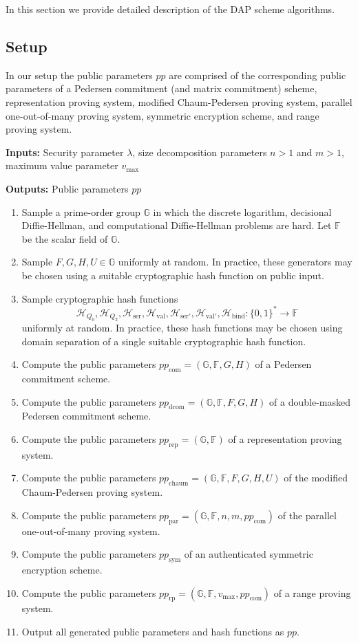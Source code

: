 \documentclass{llncs}
\newcommand{\G}{\mathbb{G}}
\newcommand{\F}{\mathbb{F}}
\newcommand{\hash}{\mathcal{H}}
\begin{document}
In this section we provide detailed description of the DAP scheme algorithms.


\subsection{Setup}

In our setup the public parameters $pp$ are comprised of the corresponding public parameters of a Pedersen commitment (and matrix commitment) scheme, representation proving system, modified Chaum-Pedersen proving system, parallel one-out-of-many proving system, symmetric encryption scheme, and range proving system.

\textbf{Inputs:} Security parameter $\lambda$, size decomposition parameters $n > 1$ and $m > 1$, maximum value parameter $v_{\text{max}}$

\textbf{Outputs:} Public parameters $pp$

\begin{enumerate}
\item Sample a prime-order group $\G$ in which the discrete logarithm, decisional Diffie-Hellman, and computational Diffie-Hellman problems are hard.
Let $\F$ be the scalar field of $\G$.
\item Sample $F,G,H,U \in \G$ uniformly at random.
In practice, these generators may be chosen using a suitable cryptographic hash function on public input.
\item Sample cryptographic hash functions $$\hash_{Q_0},\hash_{Q_2},\hash_{\text{ser}},\hash_{\text{val}},\hash_{\text{ser}'},\hash_{\text{val}'},\hash_{\text{bind}}: \{0,1\}^* \to \F$$ uniformly at random.
In practice, these hash functions may be chosen using domain separation of a single suitable cryptographic hash function.
\item Compute the public parameters $pp_{\text{com}} = (\G,\F,G,H)$ of a Pedersen commitment scheme.
\item Compute the public parameters $pp_{\text{dcom}} = (\G,\F,F,G,H)$ of a double-masked Pedersen commitment scheme.
\item Compute the public parameters $pp_{\text{rep}} = (\G,\F)$ of a representation proving system.
\item Compute the public parameters $pp_{\text{chaum}} = (\G,\F,F,G,H,U)$ of the modified Chaum-Pedersen proving system.
\item Compute the public parameters $pp_{\text{par}} = (\G,\F,n,m,pp_{\text{com}})$ of the parallel one-out-of-many proving system.
\item Compute the public parameters $pp_{\text{sym}}$ of an authenticated symmetric encryption scheme.
\item Compute the public parameters $pp_{\text{rp}} = (\G,\F,v_{\text{max}},pp_{\text{com}})$ of a range proving system.
\item Output all generated public parameters and hash functions as $pp$.
\end{enumerate}
\end{document}
